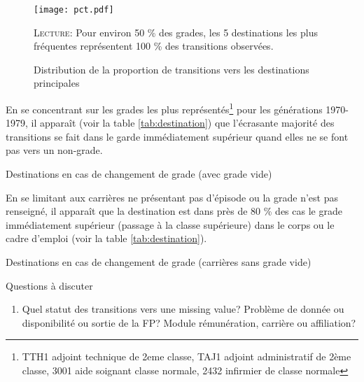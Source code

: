 \documentclass[11pt,a4paper]{article}
\begin{document}
\begin{figure}[t]
  \label{pct}
\caption{Distribution de la proportion de transitions vers les destinations principales}
\vspace{-0.1cm}
\centering
 \texttt{[image: pct.pdf]}
\vspace{0.1cm}  
\begin{minipage}{12cm}%
\small \textsc{Lecture:} Pour environ 50 \% des grades, les 5 destinations les plus fréquentes représentent 100 \% des transitions observées.  
 \end{minipage}%
\end{figure}

En se concentrant sur les grades les plus représentés\footnote{TTH1 adjoint technique de 2eme classe, TAJ1 adjoint administratif de 2ème classe, 3001 aide soignant classe normale, 2432 infirmier de classe normale}
pour les générations 1970-1979, il apparaît (voir la table \ref{tab:destination}) que l'écrasante majorité des transitions se fait dans le garde immédiatement supérieur quand elles ne se font pas vers un non-grade.
\begin{table}[htbp]
    \label{tab:destination}
    \centering
    \caption{Destinations en cas de changement de grade (avec grade vide)} 
    
\end{table}

En se limitant aux carrières ne présentant pas d'épisode ou la grade n'est pas renseigné, il apparaît que la destination est dans près de 80 \% des cas le grade immédiatement supérieur (passage à la classe supérieure) dans le corps ou le cadre d'emploi (voir la table \ref{tab:destination}).       

\begin{table}[htbp]
    \label{tab:purged_destination}
    \centering
    \caption{Destinations en cas de changement de grade (carrières sans grade vide)} 
    
\end{table}

Questions à discuter
\begin{enumerate}[leftmargin=1cm ,parsep=0cm,itemsep=0cm,topsep=0cm] 
\item Quel statut des transitions vers une missing value? Problème de donnée ou disponibilité ou sortie de la FP? Module rémunération, carrière ou affiliation? 
\end{enumerate}




\ifx\isEmbedded\undefined
\newpage
 

\end{document}

